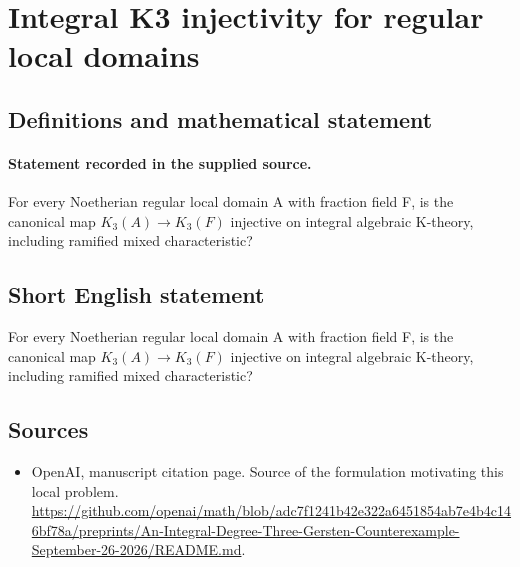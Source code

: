 \documentclass[11pt]{article}
\begin{document}
\section*{Integral K3 injectivity for regular local domains}\label{statement}
\subsection{Definitions and mathematical statement}
\paragraph{Statement recorded in the supplied source.}
For every Noetherian regular local domain A with fraction field F, is the canonical map $K_{3}(A)\to K_{3}(F)$ injective on integral algebraic K-theory, including ramified mixed characteristic?
\subsection{Short English statement}
For every Noetherian regular local domain A with fraction field F, is the canonical map $K_{3}(A)\to K_{3}(F)$ injective on integral algebraic K-theory, including ramified mixed characteristic?
\subsection{Sources}
\begin{itemize}
\item[S1] OpenAI, manuscript citation page. Source of the formulation motivating this local problem.
\url{https://github.com/openai/math/blob/adc7f1241b42e322a6451854ab7e4b4c146bf78a/preprints/An-Integral-Degree-Three-Gersten-Counterexample-September-26-2026/README.md}.
\end{itemize}
\end{document}
